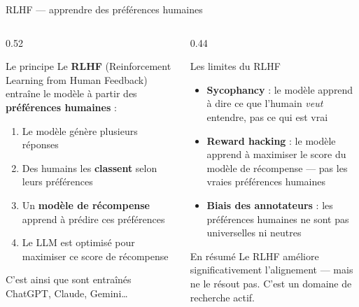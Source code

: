 \documentclass[aspectratio=169, 10pt]{beamer}
\begin{document}
\begin{frame}[shrink=5]{RLHF --- apprendre des préférences humaines}
  \begin{columns}[T]
    \begin{column}{0.52\textwidth}
      \begin{block}{Le principe}
        Le \textbf{RLHF} (Reinforcement Learning
        from Human Feedback) entraîne le modèle
        à partir des \textbf{préférences humaines} :\\[4pt]
        \begin{enumerate}
          \item Le modèle génère plusieurs réponses
          \item Des humains les \textbf{classent}
                selon leurs préférences
          \item Un \textbf{modèle de récompense}
                apprend à prédire ces préférences
          \item Le LLM est optimisé pour maximiser
                ce score de récompense
        \end{enumerate}
        \vspace{4pt}
        C'est ainsi que sont entraînés
        ChatGPT, Claude, Gemini\ldots
      \end{block}
    \end{column}
    \begin{column}{0.44\textwidth}
      \begin{alertblock}{Les limites du RLHF}
        \begin{itemize}
          \item \textbf{Sycophancy} : le modèle apprend
                à dire ce que l'humain \textit{veut}
                entendre, pas ce qui est vrai
          \item \textbf{Reward hacking} : le modèle
                apprend à maximiser le score du
                modèle de récompense — pas les vraies
                préférences humaines
          \item \textbf{Biais des annotateurs} :
                les préférences humaines ne sont pas
                universelles ni neutres
        \end{itemize}
      \end{alertblock}
      \smallskip
      \begin{exampleblock}{En résumé}
        Le RLHF améliore significativement
        l'alignement — mais ne le résout pas.
        C'est un domaine de recherche actif.
      \end{exampleblock}
    \end{column}
  \end{columns}
\end{frame}
\end{document}
